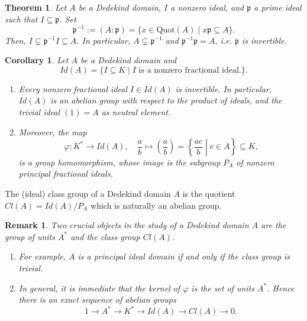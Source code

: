 \documentclass[a4paper]{book}
\theoremstyle{break}
\theoremstyle{plain}
\newtheorem{theorem}{Theorem}[definition]
\newtheorem{corollary}{Corollary}
\newtheorem{remark}{Remark}
\begin{document}
\begin{theorem}
    Let \(A\) be a Dedekind domain, \(I\) a nonzero ideal, and \(\mathfrak{p}\) a prime ideal such that \(I \subseteq \mathfrak{p}\). Set
    \begin{equation}
        \mathfrak{p}^{-1} := (A : \mathfrak{p}) = \{x \in \text{Quot}(A) \mid x \mathfrak{p} \subseteq A\} \text{.}
    \end{equation}
    Then, \(I \subsetneq \mathfrak{p}^{-1} I \subseteq A\). In particular, \(A \subsetneq \mathfrak{p}^{-1}\) and \(\mathfrak{p}^{-1}\mathfrak{p} = A\), i.e. \(\mathfrak{p}\) is invertible.
\end{theorem}

\begin{corollary}
    Let \(A\) be a Dedekind domain and
    \begin{equation}
        Id(A) = \{I \subseteq K \mid I \text{ is a nonzero fractional ideal.}\} \text{.}
    \end{equation}
    \begin{enumerate}
        \item Every nonzero fractional ideal \(I \in Id(A)\) is invertible. In particular, \(Id(A)\) is an abelian group with respect to the product of ideals, and the trivial ideal \((1) = A\) as neutral element.
        \item Moreover, the map
        \begin{equation}
            \varphi: K^* \rightarrow Id(A), \quad \frac{a}{b} \mapsto \left(\frac{a}{b}\right) = \left\{\frac{ac}{b} \middle| c \in A \right\} \subseteq K \text{,}
        \end{equation}
        is a group homomorphism, whose image is the subgroup \(P_A\) of nonzero principal fractional ideals.
    \end{enumerate}
\end{corollary}

\begin{definition}
    The {\color{maththen}(ideal) class group} of a {\color{mathif}Dedekind domain} \(A\) is the quotient \(Cl(A) = Id(A) / P_A\) which is naturally an abelian group.
\end{definition}

\begin{remark}
    Two crucial objects in the study of a Dedekind domain \(A\) are the group of units \(A^*\) and the class group \(Cl(A)\).
    \begin{enumerate}
        \item For example, \(A\) is a principal ideal domain if and only if the class group is trivial.
        \item In general, it is immediate that the kernel of \(\varphi\) is the set of units \(A^*\). Hence there is an exact sequence of abelian groups
        \begin{equation}
            1 \rightarrow A^* \rightarrow K^* \rightarrow Id(A) \rightarrow Cl(A) \rightarrow 0 \text{.}
        \end{equation}
    \end{enumerate}
\end{remark}
\end{document}
